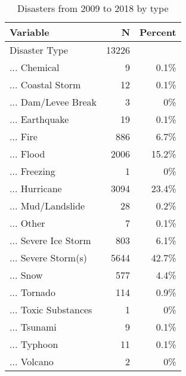 \begin{table}[!htbp] \centering \renewcommand*{\arraystretch}{1.1}\caption{Disasters from 2009 to 2018 by type}\label{DisasterTypes}
\begin{tabular}{lrr}
\hline
\hline
Variable & N & Percent \\ 
\hline
Disaster Type & 13226 &  \\ 
... Chemical & 9 & 0.1\% \\ 
... Coastal Storm & 12 & 0.1\% \\ 
... Dam/Levee Break & 3 & 0\% \\ 
... Earthquake & 19 & 0.1\% \\ 
... Fire & 886 & 6.7\% \\ 
... Flood & 2006 & 15.2\% \\ 
... Freezing & 1 & 0\% \\ 
... Hurricane & 3094 & 23.4\% \\ 
... Mud/Landslide & 28 & 0.2\% \\ 
... Other & 7 & 0.1\% \\ 
... Severe Ice Storm & 803 & 6.1\% \\ 
... Severe Storm(s) & 5644 & 42.7\% \\ 
... Snow & 577 & 4.4\% \\ 
... Tornado & 114 & 0.9\% \\ 
... Toxic Substances & 1 & 0\% \\ 
... Tsunami & 9 & 0.1\% \\ 
... Typhoon & 11 & 0.1\% \\ 
... Volcano & 2 & 0\%\\ 
\hline
\hline
\end{tabular}
\end{table}

